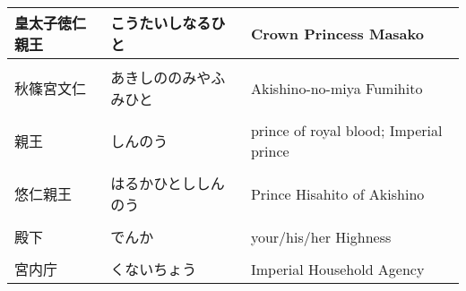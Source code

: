 \documentclass{article}
\begin{document}
\begin{tabular}{ l | l | p{7.5cm} }
皇太子徳仁親王 & こうたいしなるひと & Crown Princess Masako \\ \hline \\[-1em]
秋篠宮文仁 & あきしののみやふみひと & Akishino-no-miya Fumihito \\ \hline \\[-1em]
親王 & しんのう & prince of royal blood; Imperial prince \\ \hline \\[-1em]
悠仁親王 & はるかひとししんのう & Prince Hisahito of Akishino \\ \hline \\[-1em]
殿下 & でんか & your/his/her Highness \\ \hline \\[-1em]
宮内庁 & くないちょう & Imperial Household Agency %
\end{tabular}
\end{document}
